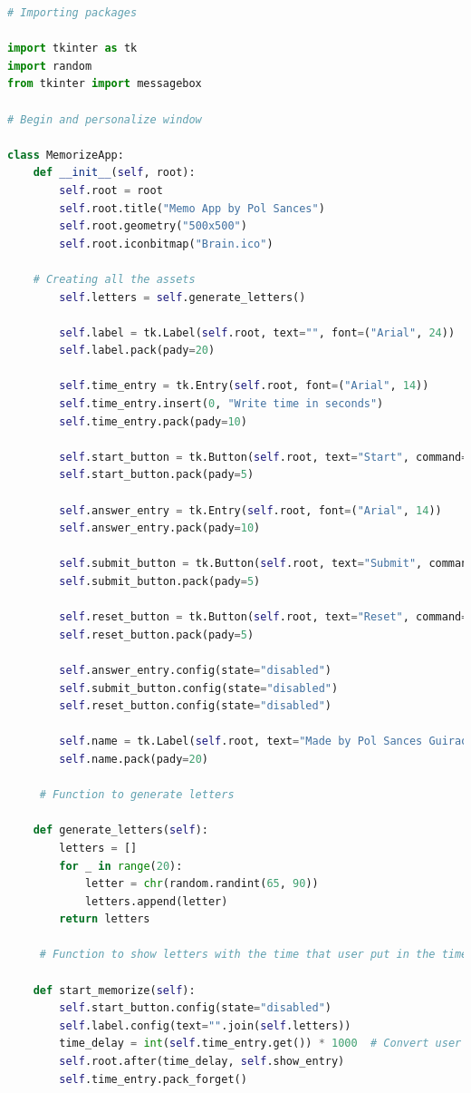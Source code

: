 \begin{lstlisting}[language=Python, style=colorEX, caption=Python example]
    # Importing packages

import tkinter as tk
import random
from tkinter import messagebox

# Begin and personalize window

class MemorizeApp:
    def __init__(self, root):
        self.root = root
        self.root.title("Memo App by Pol Sances")
        self.root.geometry("500x500")
        self.root.iconbitmap("Brain.ico")

    # Creating all the assets
        self.letters = self.generate_letters()

        self.label = tk.Label(self.root, text="", font=("Arial", 24))
        self.label.pack(pady=20)

        self.time_entry = tk.Entry(self.root, font=("Arial", 14))
        self.time_entry.insert(0, "Write time in seconds")
        self.time_entry.pack(pady=10)

        self.start_button = tk.Button(self.root, text="Start", command=self.start_memorize)
        self.start_button.pack(pady=5)

        self.answer_entry = tk.Entry(self.root, font=("Arial", 14))
        self.answer_entry.pack(pady=10)

        self.submit_button = tk.Button(self.root, text="Submit", command=self.check_answers)
        self.submit_button.pack(pady=5)

        self.reset_button = tk.Button(self.root, text="Reset", command=self.reset)
        self.reset_button.pack(pady=5)

        self.answer_entry.config(state="disabled")
        self.submit_button.config(state="disabled")
        self.reset_button.config(state="disabled")

        self.name = tk.Label(self.root, text="Made by Pol Sances Guirao", font=("Arial", 8))
        self.name.pack(pady=20)

     # Function to generate letters

    def generate_letters(self):
        letters = []
        for _ in range(20):
            letter = chr(random.randint(65, 90))
            letters.append(letter)
        return letters
    
     # Function to show letters with the time that user put in the time_entry textbox.

    def start_memorize(self):
        self.start_button.config(state="disabled")
        self.label.config(text="".join(self.letters))
        time_delay = int(self.time_entry.get()) * 1000  # Convert user seconds to milliseconds
        self.root.after(time_delay, self.show_entry)
        self.time_entry.pack_forget()  


\end{lstlisting}
